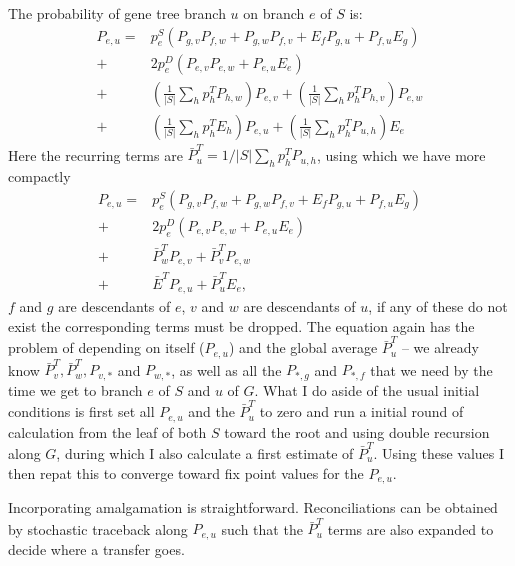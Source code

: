 \documentclass[preprint,superscriptaddress,aip,author-year]{revtex4-1}
\begin{document}
The probability of gene tree branch $u$ on branch $e$ of $S$ is:
\begin{align}
P_{e,u} =&  p^S_e \left( P_{g,v} P_{f,w} + P_{g,w} P_{f,v} + E_f P_{g,u} + P_{f,u} E_g
\right) \nonumber \\
+& 2 p^D_e \left( P_{e,v} P_{e,w} + P_{e,u} E_e \right) \nonumber \\
+&\left( \frac{1}{|S|} \sum_h p^T_h  P_{h,w} \right)  P_{e,v}  +
   \left( \frac{1}{|S|} \sum_h p^T_h  P_{h,v} \right) P_{e,w}\nonumber \\ +& \left(
   \frac{1}{|S|} \sum_h p^T_h  E_h \right)  P_{e,u}  + \left( \frac{1}{|S|} \sum_h p^T_h  P_{u,h} \right)  E_e 
\end{align}
Here the recurring terms are $\bar P^T_u = 1/|S| \sum_h p^T_h P_{u,h}$,
using which we have more compactly   
\begin{align}
P_{e,u} =&  p^S_e \left( P_{g,v} P_{f,w} + P_{g,w} P_{f,v} + E_f P_{g,u} + P_{f,u} E_g
\right) \nonumber \\
+& 2 p^D_e \left( P_{e,v} P_{e,w} + P_{e,u} E_e \right) \nonumber \\
+&\bar P^T_w  P_{e,v}  + \bar P^T_v P_{e,w}\nonumber \\ +& \bar E^T P_{e,u}  + \bar P^T_u  E_e,
\end{align}
$f$ and
$g$ are descendants of $e$, $v$ and
$w$ are descendants of $u$,  if any of these do not exist the corresponding
terms must be dropped.
The equation again has the problem of depending on itself ($P_{e,u}$) and
the global average $\bar P^T_{u}$ -- we already know $\bar P^T_v,\bar
P^T_w ,P_{v,*}$ and $P_{w,*}$,
as well as  all the $P_{*,g}$ and $P_{*,f}$ that we need by the
time we get to branch $e$ of $S$ and $u$ of $G$. What I do
aside of the usual initial conditions is first set all $P_{e,u}$ and
the $\bar
P^T_u$  to zero
and run a initial round of calculation from the leaf of both $S$ 
toward the root and using double recursion along $G$,
during which I also calculate a first estimate of $\bar
P^T_u$.
Using these values I then repat this to converge toward fix point values for the $P_{e,u}$.    

Incorporating amalgamation is straightforward. Reconciliations can be
obtained by stochastic traceback along $P_{e,u}$ such that the $\bar
P^T_u$ terms are also expanded to decide where a transfer goes.
  
\end{document}
